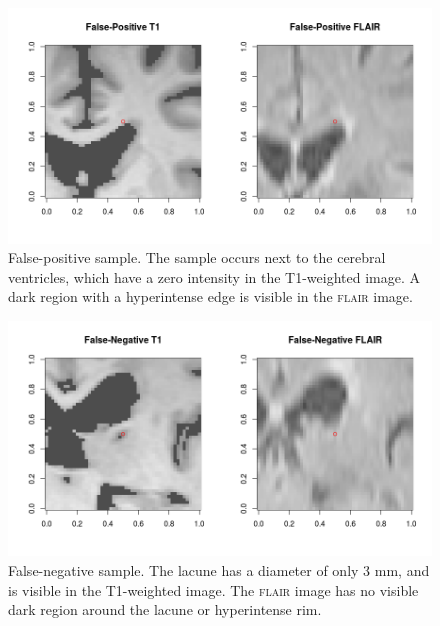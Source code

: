 \begin{figure}[ht]
\centering
\includegraphics[width=\linewidth]{Images/7_FP_t1_flair2.png}
\caption{False-positive sample. The sample occurs next to the cerebral ventricles, which have a zero intensity in the T1-weighted image. A dark region with a hyperintense edge is visible in the \textsc{flair} image.}
\label{results-fp2}
\end{figure}

\begin{figure}[ht]
\centering
\includegraphics[width=\linewidth]{Images/7_FN_t1_flair.png}
\caption{False-negative sample. The lacune has a diameter of only 3 mm, and is visible in the T1-weighted image. The \textsc{flair} image has no visible dark region around the lacune or hyperintense rim.}
\label{results-fn}
\end{figure}

